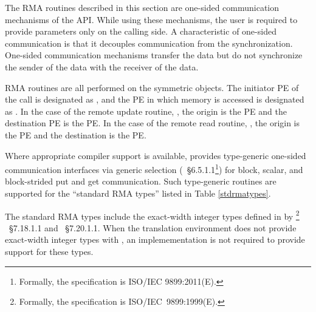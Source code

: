 The \ac{RMA} routines described in this section are one-sided communication
mechanisms of the \openshmem \ac{API}. While using these mechanisms, the user
is required to provide parameters only on the calling side. A characteristic of
one-sided communication is that it decouples communication from the
synchronization. One-sided communication mechanisms transfer the data but do not
synchronize the sender of the data with the receiver of the data. 

\openshmem \ac{RMA} routines are all performed on the symmetric objects.  The
initiator \ac{PE} of the call is designated as \source{}, and the \ac{PE} in
which memory is accessed is designated as \dest{}. In the case of the remote
update routine, \PUT{}, the origin is the \source{} \ac{PE} and the destination
\ac{PE} is the \dest{} PE. In the case of the remote read routine, \GET{}, the
origin is the \dest{} \ac{PE} and the destination is the \source{} \ac{PE}.

Where appropriate compiler support is available, \openshmem provides type-generic 
one-sided communication interfaces via \Cstd[11] generic selection
(\Cstd[11]~\S6.5.1.1\footnote{Formally, the \Cstd[11] specification is ISO/IEC 9899:2011(E).})
for block, scalar, and block-strided put and get communication. 
Such type-generic routines are supported for the ``standard \ac{RMA} types''
listed in Table \ref{stdrmatypes}.

The standard \ac{RMA} types include the exact-width integer types defined in
 by \Cstd[99]%
\footnote{Formally, the \Cstd[99] specification is ISO/IEC~9899:1999(E).}%
~\S7.18.1.1 and \Cstd[11]~\S7.20.1.1. When the \Cstd translation environment
does not provide exact-width integer types with , an
\openshmem implemementation is not required to provide support for these types.

